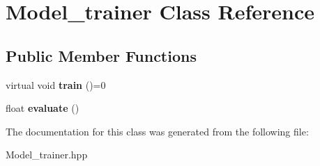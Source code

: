 \hypertarget{class_model__trainer}{\section{Model\+\_\+trainer Class Reference}
\label{class_model__trainer}
}
\subsection*{Public Member Functions}
\begin{DoxyCompactItemize}
\item 
\hypertarget{class_model__trainer_a1255f492c38a0386dffc299264713ebe}{virtual void {\bfseries train} ()=0}\label{class_model__trainer_a1255f492c38a0386dffc299264713ebe}

\item 
\hypertarget{class_model__trainer_ae8e4dc1b16703f078819b43b5ae89a20}{float {\bfseries evaluate} ()}\label{class_model__trainer_ae8e4dc1b16703f078819b43b5ae89a20}

\end{DoxyCompactItemize}


The documentation for this class was generated from the following file\+:\begin{DoxyCompactItemize}
\item 
Model\+\_\+trainer.\+hpp\end{DoxyCompactItemize}
